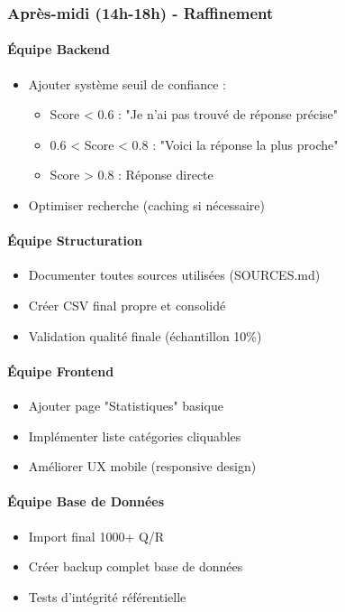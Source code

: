 \documentclass[11pt,a4paper]{article}
\begin{document}
\subsubsection{Après-midi (14h-18h) - Raffinement}

\paragraph{Équipe Backend}
\begin{itemize}
    \item[$\square$] Ajouter système seuil de confiance :
    \begin{itemize}
        \item Score < 0.6 : "Je n'ai pas trouvé de réponse précise"
        \item 0.6 < Score < 0.8 : "Voici la réponse la plus proche"
        \item Score > 0.8 : Réponse directe
    \end{itemize}
    \item[$\square$] Optimiser recherche (caching si nécessaire)
\end{itemize}

\paragraph{Équipe Structuration}
\begin{itemize}
    \item[$\square$] Documenter toutes sources utilisées (SOURCES.md)
    \item[$\square$] Créer CSV final propre et consolidé
    \item[$\square$] Validation qualité finale (échantillon 10\%)
\end{itemize}

\paragraph{Équipe Frontend}
\begin{itemize}
    \item[$\square$] Ajouter page "Statistiques" basique
    \item[$\square$] Implémenter liste catégories cliquables
    \item[$\square$] Améliorer UX mobile (responsive design)
\end{itemize}

\paragraph{Équipe Base de Données}
\begin{itemize}
    \item[$\square$] Import final 1000+ Q/R
    \item[$\square$] Créer backup complet base de données
    \item[$\square$] Tests d'intégrité référentielle
\end{itemize}
\end{document}
